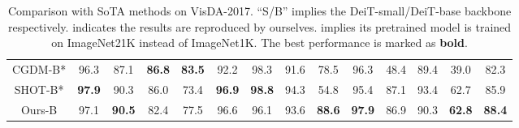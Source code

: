 \documentclass[dvipsnames, svgnames, x11names, table]{article} \usepackage{iclr2022_conference,times}
\begin{document}
\begin{spacing}{1.0}
\begin{table*}[!t]
\begin{tabular}{c|cccccccccccc>{\columncolor{lightgray}}c}
CGDM-B* & 96.3 & 87.1 & \textbf{86.8} & \textbf{83.5} & 92.2 & 98.3 & 91.6 & 78.5 & 96.3 & 48.4 & 89.4 & 39.0 & 82.3 \\
SHOT-B* & \textbf{97.9} & 90.3 & 86.0 & 73.4 & \textbf{96.9} & \textbf{98.8} & 94.3 & 54.8 & 95.4 & 87.1 & 93.4 & 62.7 & 85.9 \\
Ours-B & 97.1 & \textbf{90.5} & 82.4 & 77.5 & 96.6 & 96.1 & 93.6 & \textbf{88.6} & \textbf{97.9} & 86.9 & 90.3 & \textbf{62.8} & \textbf{88.4} \\
\hline
\end{tabular}
\vspace{-2mm}
\caption{Comparison with SoTA methods on VisDA-2017. ``S/B'' implies the DeiT-small/DeiT-base backbone respectively.  indicates the results are reproduced by ourselves.  implies its pretrained model is trained on ImageNet21K instead of ImageNet1K. The best performance is marked as \textbf{bold}.}
\label{tab:visda}
\vspace{-1mm}
\end{table*}


\end{spacing}
\end{document}
